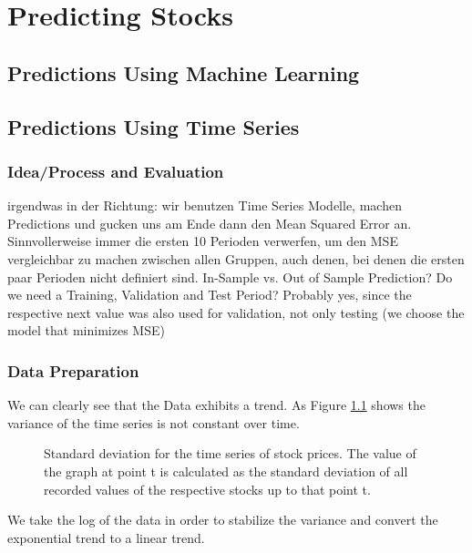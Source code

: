 \chapter{Predicting Stocks}\label{ch:predictions}


\section{Predictions Using Machine Learning}

\section{Predictions Using Time Series}
\subsection{Idea/Process and Evaluation}
irgendwas in der Richtung: wir benutzen Time Series Modelle, machen Predictions und gucken uns am Ende dann den Mean Squared Error an. Sinnvollerweise immer die ersten 10 Perioden verwerfen, um den MSE vergleichbar zu machen zwischen allen Gruppen, auch denen, bei denen die ersten paar Perioden nicht definiert sind. 	
In-Sample vs. Out of Sample Prediction?
Do we need a Training, Validation and Test Period? Probably yes, since the respective next value was also used for validation, not only testing (we choose the model that minimizes MSE)

\subsection{Data Preparation}

We can clearly see that the Data exhibits a trend. As Figure \ref{fig:cum_sd_all} shows the variance of the time series is not constant over time. 

\begin{figure}[h]
    \centering
    \begin{adjustbox}{width=.9\textwidth,center}
    
    \end{adjustbox}  
    \caption{Standard deviation for the time series of stock prices. The value of the graph at point t is calculated as the standard deviation of all recorded values of the respective stocks up to that point t.}
    \label{fig:cum_sd_all}
\end{figure}{}

We take the log of the data in order to stabilize the variance and convert the exponential trend to a linear trend. 

